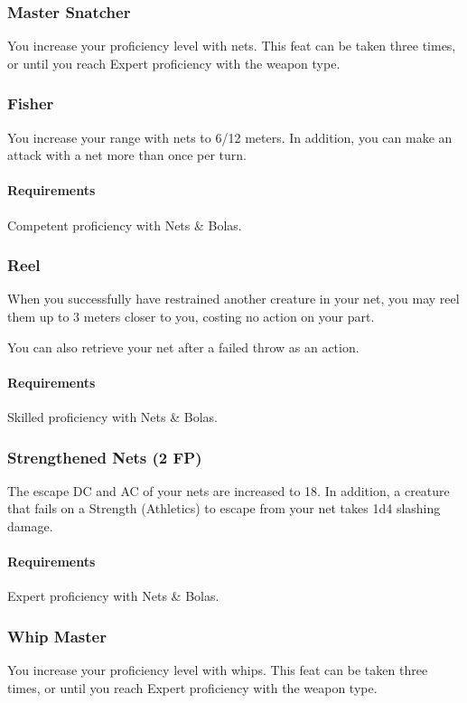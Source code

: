 \subsubsection{Master Snatcher} \label{feat::snatcher}
    You increase your proficiency level with nets.
    This feat can be taken three times, or until you reach Expert proficiency with the weapon type.
\subsubsection{Fisher} \label{feat::fisher}
    You increase your range with nets to 6/12 meters.
    In addition, you can make an attack with a net more than once per turn.
    \paragraph{Requirements} Competent proficiency with Nets \& Bolas.
\subsubsection{Reel} \label{feat::reel}
    When you successfully have restrained another creature in your net, you may reel them up to 3 meters closer to you, costing no action on your part.

    You can also retrieve your net after a failed throw as an action.
    \paragraph{Requirements} Skilled proficiency with Nets \& Bolas.
\subsubsection{Strengthened Nets (2 FP)} \label{feat::strengthenednets}
    The escape DC and AC of your nets are increased to 18.
    In addition, a creature that fails on a Strength (Athletics) to escape from your net takes 1d4 slashing damage.
    \paragraph{Requirements} Expert proficiency with Nets \& Bolas.
\subsubsection{Whip Master} \label{feat::whipmaster}
    You increase your proficiency level with whips.
    This feat can be taken three times, or until you reach Expert proficiency with the weapon type.
